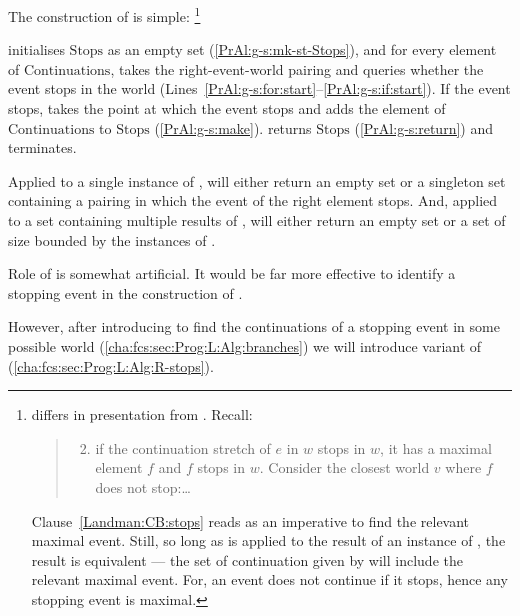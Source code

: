\begin{note}
  The construction of \AlgGetStops{} is simple:%
  \footnote{
    \AlgGetStops{} differs in presentation from \citeauthor{Landman:1992wh}.
    Recall:
    \begin{quote}
      \begin{enumerate}[label=\arabic*., ref=(\arabic*)]
        \setcounter{enumi}{1}
      \item
        if the continuation stretch of \(e\) in \(w\) stops in \(w\), it has a maximal element \(f\) and \(f\) stops in \(w\).
        Consider the closest world \(v\) where \(f\) does not stop:\dots
      \end{enumerate}
    \end{quote}
    Clause~\ref{Landman:CB:stops} reads as an imperative to find the relevant maximal event.
    Still, so long as \AlgGetStops{} is applied to the result of an instance of \AlgAC{}, the result is equivalent --- the set of continuation given by \AlgAC{} will include the relevant maximal event.
    For, an event does not continue if it stops, hence any stopping event is maximal.
  }

  \AlgGetStops{} initialises \(\text{Stops}\) as an empty set (\autoref{PrAl:g-s:mk-st-Stops}), and for every element of \(\text{Continuations}\), \AlgGetStops{} takes the right-event-world pairing and queries whether the event stops in the world (Lines~\ref{PrAl:g-s:for:start}--\ref{PrAl:g-s:if:start}).
  If the event stops, \AlgGetStops{} takes the point at which the event stops and adds the element of \(\text{Continuations}\)%
  to \(\text{Stops}\) (\autoref{PrAl:g-s:make}).
  \AlgGetStops{} returns \(\text{Stops}\) (\autoref{PrAl:g-s:return}) and terminates.
\end{note}

\begin{note}
  Applied to a single instance of \AlgAC{}, \AlgGetStops{} will either return an empty set or a singleton set containing a pairing in which the event of the right element stops.
  And, applied to a set containing multiple results of \AlgAC{}, \AlgGetStops{} will either return an empty set or a set of size bounded by the instances of \AlgAC{}.
\end{note}

\begin{note}
  Role of \AlgGetStops{} is somewhat artificial.
  It would be far more effective to identify a stopping event in the construction of \AlgAC{}.

  However, after introducing \AlgFindBranches{} to find the continuations of a stopping event in some possible world (\autoref{cha:fcs:sec:Prog:L:Alg:branches}) we will introduce variant of \AlgGetStops{} (\autoref{cha:fcs:sec:Prog:L:Alg:R-stops}).
\end{note}

